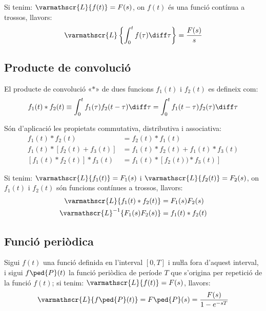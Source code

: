 Si tenim: $\varmathscr{L} \{f(t) \} = F(s)$, on $f(t)$ és una
funció contínua a trossos, 
llavors:
\begin{align}
    \varmathscr{L} \left\lbrace  \int_0^t f(\tau) \diff \tau \right\rbrace  = \frac{F(s)}{s}
\end{align}

\subsection{Producte de convolució}\label{sec:prod-convolucio}

El producte de convolució «$*$» de dues funcions $f_1(t)$ i $f_2(t)$ es
defineix com:
\begin{equation}
    f_1(t) * f_2(t) \equiv \int_0^t f_1(\tau) f_2(t-\tau) \diff\tau =
    \int_0^t f_1(t-\tau) f_2(\tau) \diff\tau
\end{equation}

Són d'aplicació les propietats commutativa, distributiva i associativa:
\begin{subequations}
	\begin{align}
		f_1(t) * f_2(t) &= f_2(t) * f_1(t) \\
		f_1(t) * [f_2(t) + f_3(t)] &= f_1(t) * f_2(t) + f_1(t) * f_3(t)\\
	    [f_1(t) * f_2(t)] * f_3(t) &=  f_1(t) * [f_2(t)) * f_3(t)]
	\end{align}
\end{subequations}

Si tenim: $\varmathscr{L} \{f_1(t) \} = F_1(s)$ i $\varmathscr{L}
\{f_2(t) \} = F_2(s)$, on $f_1(t)$ i $f_2(t)$ són funcions
contínues a trossos, llavors:
\begin{align}
    \varmathscr{L} \{ f_1(t) * f_2(t) \} &= F_1(s) F_2(s)\\
    \varmathscr{L}^{-1} \{ F_1(s) F_2(s) \} &= f_1(t) * f_2(t)
\end{align}

\subsection{Funció periòdica}

Sigui $f(t)$ una funció definida en l'interval $[0,T]$ i nuŀla
fora d'aquest interval, i sigui $f\ped{P}(t)$ la funció periòdica de
període $T$ que s'origina per repetició de la funció $f(t)$; si
tenim: $\varmathscr{L} \{f(t) \} = F(s)$, llavors:
\begin{equation}
   \varmathscr{L} \{f\ped{P}(t) \} = F\ped{P}(s) = \frac{F(s)}{1-e^{-sT}}
\end{equation}


